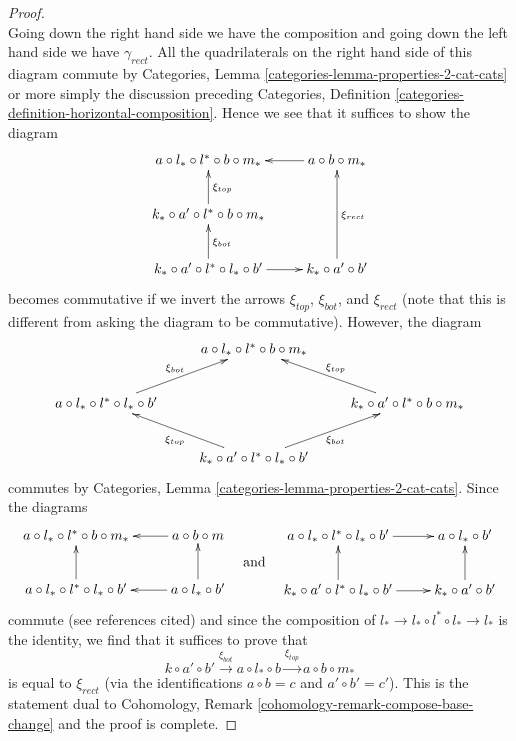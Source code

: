 \documentclass[10pt,a4paper]{amsart}
\theoremstyle{plain}
\theoremstyle{definition}
\theoremstyle{remark}
\numberwithin{equation}{subsection}
\begin{document}
\begin{proof}
$${}
$$
Going down the right hand side we have the composition and going
down the left hand side we have $\gamma_{rect}$.
All the quadrilaterals on the right hand side of this diagram commute
by Categories, Lemma \ref{categories-lemma-properties-2-cat-cats}
or more simply the discussion preceding
Categories, Definition \ref{categories-definition-horizontal-composition}.
Hence we see that it suffices to show the diagram
$$
\xymatrix{
a \circ l_* \circ l^* \circ b \circ m_* &
a \circ b \circ m_* \ar[l] \\
k_* \circ a' \circ l^* \circ b \circ m_* \ar[u]_{\xi_{top}} & \\
k_* \circ a' \circ l^* \circ l_* \circ b' \ar[u]_{\xi_{bot}} \ar[r] &
k_* \circ a' \circ b' \ar[uu]_{\xi_{rect}}
}
$$
becomes commutative if we invert the arrows $\xi_{top}$, $\xi_{bot}$,
and $\xi_{rect}$ (note that this is different from asking the
diagram to be commutative). However, the diagram
$$
\xymatrix{
& a \circ l_* \circ l^* \circ b \circ m_* \\
a \circ l_* \circ l^* \circ l_* \circ b'
\ar[ru]^{\xi_{bot}} & &
k_* \circ a' \circ l^* \circ b \circ m_* \ar[ul]_{\xi_{top}} \\
& k_* \circ a' \circ l^* \circ l_* \circ b'
\ar[ul]^{\xi_{top}} \ar[ur]_{\xi_{bot}}
}
$$
commutes by Categories, Lemma \ref{categories-lemma-properties-2-cat-cats}.
Since the diagrams
$$
\vcenter{
\xymatrix{
a \circ l_* \circ l^* \circ b \circ m_* & a \circ b \circ m \ar[l] \\
a \circ l_* \circ l^* \circ l_* \circ b' \ar[u] &
a \circ l_* \circ b' \ar[l] \ar[u]
}
}
\quad\text{and}\quad
\vcenter{
\xymatrix{
a \circ l_* \circ l^* \circ l_* \circ b' \ar[r] & a \circ l_* \circ b' \\
k_* \circ a' \circ l^* \circ l_* \circ b' \ar[u] \ar[r] &
k_* \circ a' \circ b' \ar[u]
}
}
$$
commute (see references cited) and since the composition of
$l_* \to l_* \circ l^* \circ l_* \to l_*$ is the identity,
we find that it suffices to prove that
$$
k \circ a' \circ b' \xrightarrow{\xi_{bot}} a \circ l_* \circ b
\xrightarrow{\xi_{top}} a \circ b \circ m_*
$$
is equal to $\xi_{rect}$ (via the identifications $a \circ b = c$
and $a' \circ b' = c'$). This is the statement dual to
Cohomology, Remark \ref{cohomology-remark-compose-base-change}
and the proof is complete.
\end{proof}
\end{document}
